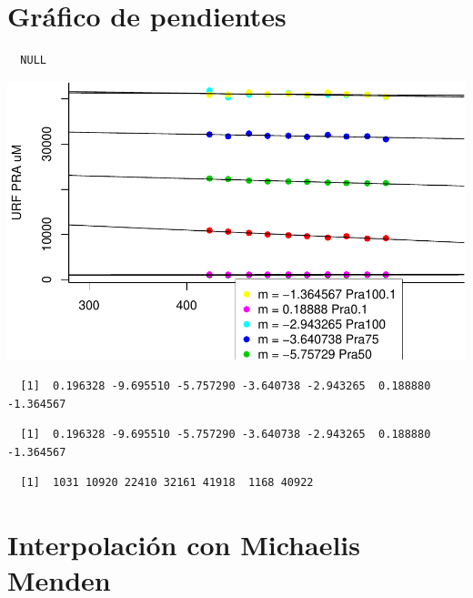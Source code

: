 \documentclass[12pt,twoside]{reedthesis}
\begin{document}
  \section{Gráfico de pendientes}\label{grafico-de-pendientes}
  
  \begin{verbatim}
  NULL
  \end{verbatim}
  
  \begin{center}\includegraphics{tesis_files/figure-latex/slopes-1} \end{center}
  
  \begin{verbatim}
  [1]  0.196328 -9.695510 -5.757290 -3.640738 -2.943265  0.188880 -1.364567
  \end{verbatim}
  
  \begin{verbatim}
  [1]  0.196328 -9.695510 -5.757290 -3.640738 -2.943265  0.188880 -1.364567
  \end{verbatim}
  
  \begin{verbatim}
  [1]  1031 10920 22410 32161 41918  1168 40922
  \end{verbatim}
  
  \section{Interpolación con Michaelis
  Menden}\label{interpolacion-con-michaelis-menden}
  
  \begin{Shaded}
  \begin{Highlighting}[]
  \end{Highlighting}
  \end{Shaded}
  
\end{document}
